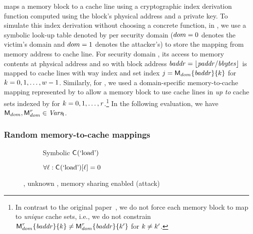 \scatterCache maps a memory block to a cache line using a
cryptographic index derivation function computed using the block's
physical address and a private key. To simulate this index derivation
without choosing a concrete function, in ,
we use a symbolic look-up table denoted by \cacheMap{\domainIdx} per
security domain \domainIdx ($dom=0$ denotes the victim's domain
and $dom=1$ denotes the attacker's) to store the mapping from
memory address to cache line. For security domain \domainIdx, its
access to memory contents at physical address \memAddr and so with
block address $\mathit{baddr} = \lfloor \mathit{paddr}/\mathit{bbytes} \rfloor$ is
mapped to cache lines with way index \wayIdx and set index
$j = \textsf{M}_{dom}\{\mathit{baddr}\}\{k\}$ for
$k=0,1,\ldots,w-1$.  Similarly, for ,
we used a domain-specific memory-to-cache mapping represented by
 to allow a memory block to use cache
lines in \textit{up to}  cache sets indexed by
 for $k=0,
1, \ldots, \mathit{r}$.\footnote{In contrast to the
  original paper~\cite{phantomCache}, we do not force each memory
  block to map to  \textit{unique} cache sets,
  i.e., we do not constrain
  $\textsf{M}^{\mathit{r}}_{dom}\{\mathit{baddr}\}\{k\}\neq
  \textsf{M}^{\mathit{r}}_{dom}\{\mathit{baddr}\}\{k'\}$ for
  $k\neq k'$.} In the following evaluation, we have
$\textsf{M}_{dom}, \textsf{M}^{\mathit{r}}_{dom} \in \mathit{Vars_{\mathsf{I}_{}}}$.

\subsubsection{Random memory-to-cache mappings}
\begin{figure}[t]
\begin{subfigure}[t]{0.49\columnwidth}
\resizebox{\linewidth}{!}{\protect\small}
\caption{Symbolic $\mathsf{C}_{}(\textrm{`load'})$}
\label{fig:scatter:jaccard:sharedsymload}
\end{subfigure}%
\hfill
\begin{subfigure}[t]{0.49\columnwidth}
\resizebox{\linewidth}{!}{\protect\small}
\caption{$\forall \ell: \mathsf{C}_{}(\textrm{`load'})[\ell] = 0$}
\label{fig:scatter:jaccard:flushreload}
\end{subfigure}%
\caption{\scatterCache, unknown \cacheMap{\domainIdx}, memory
  sharing enabled (\flushreload attack)\label{fig:scatter:jaccard:shared}}
\end{figure}


